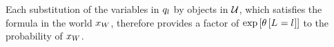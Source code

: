 Each substitution of the variables in $q_{l}$ by objects in $\mathcal{U}$, which satisfies the formula in the world $x_{W}$, therefore provides a factor of $\mathrm{exp}\left[\theta\left[L_{}=l_{}\right]\right]$ to the probability of $x_{W}$.


%
%




